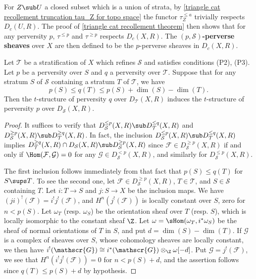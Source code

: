 For $Z\sub U$ a closed subset which is a union of strata, by \cref{triangle cat recollement truncation tau_Z for topo space} the functor $\tau^{\leq a}_Z$ trivially respects $D_c(U,R)$. The proof of \cref{triangle cat recollement theorem} then shows that for any perversity $p$, $\tau^{\leq p}$ and $\tau^{\geq p}$ respects $D_c(X,R)$. The \textbf{$(p,\mathcal{S})$-perverse sheaves} over $X$ are then defined to be the $p$-perverse sheaves in $D_c(X,R)$.\par

\begin{proposition}\label{triangle cat constructible perverse structure refinement}
Let $\mathcal{T}$ be a stratification of $X$ which refines $\mathcal{S}$ and satisfies conditions (P2), (P3). Let $p$ be a perversity over $S$ and $q$ a perversity over $\mathcal{T}$. Suppose that for any stratum $S$ of $\mathcal{S}$ containing a stratum $T$ of $\mathcal{T}$, we have
\[p(S)\leq q(T)\leq p(S)+\dim(S)-\dim(T).\]
Then the $t$-structure of perversity $q$ over $D_\mathcal{T}(X,R)$ induces the $t$-structure of perversity $p$ over $D_\mathcal{S}(X,R)$.
\end{proposition}
\begin{proof}
It suffices to verify that $D_\mathcal{S}^{\leq p}(X,R)\sub D_\mathcal{T}^{\leq q}(X,R)$ and $D_\mathcal{S}^{\geq p}(X,R)\sub D_\mathcal{T}^{\geq q}(X,R)$. In fact, the inclusion $D_\mathcal{S}^{\leq p}(X,R)\sub D_\mathcal{T}^{\leq q}(X,R)$ implies $D_\mathcal{T}^{\geq q}(X,R)\cap D_\mathcal{S}(X,R)\sub D_\mathcal{S}^{\geq p}(X,R)$ since $\mathcal{F}\in D_\mathcal{S}^{\geq p}(X,R)$ if and only if $\Hom(\mathcal{F},\mathcal{G})=0$ for any $\mathcal{G}\in D_\mathcal{S}^{<p}(X,R)$, and similarly for $D_\mathcal{S}^{\leq p}(X,R)$.\par
The first inclusion follows immediately from that fact that $p(S)\leq q(T)$ for $S\sups T$. To see the second one, let $\mathscr{F}\in D_\mathcal{S}^{\geq p}(X,R)$, $T\in\mathcal{T}$, and $S\in\mathcal{S}$ containing $T$. Let $i:T\to S$ and $j:S\to X$ be the inclusion maps. We have $(ji)^!(\mathscr{F})=i^!j^!(\mathscr{F})$, and $H^n(j^!(\mathscr{F}))$ is locally constant over $S$, zero for $n<p(S)$. Let $\omega_T$ (resp. $\omega_S$) be the orientation sheaf over $T$ (resp. $S$), which is locally isomorphic to the constant sheaf $\Z$. Let $\omega=\sHom(\omega_T,i^*\omega_S)$ be the sheaf of normal orientations of $T$ in $S$, and put $d=\dim(S)-\dim(T)$. If $\mathscr{G}$ is a complex of sheaves over $S$, whose cohomology sheaves are locally constant, we then have $i^!(\mathscr{G})\cong i^*(\mathscr{G})\otimes_{\Z}\omega[-d]$. Put $\mathscr{G}=j^!(\mathscr{F})$, we see that $H^n(i^!j^!(\mathscr{F}))=0$ for $n<p(S)+d$, and the assertion follows since $q(T)\leq p(S)+d$ by hypothesis.
\end{proof}

